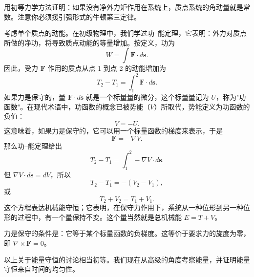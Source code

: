 \begin{example}[用初等力学证明角动量守恒]
用初等力学方法证明：如果没有净外力矩作用在系统上，质点系统的角动量就是常数。注意你必须援引强形式的牛顿第三定律。
\end{example}

考虑单个质点的动能。在初级物理中，我们学过功--能定理，它表明：外力对质点所做的净功，将导致质点动能的等量增加。按定义，功为
\begin{equation}\label{eq:1.W}
W = \int \mathbf{F}\cdot d\mathbf{s}.
\end{equation}
因此，受力 $\mathbf{F}$ 作用的质点从点 1 到点 2 的动能增加为
\begin{equation}\label{eq:1.W12}
T_2 - T_1 = \int_1^2 \mathbf{F}\cdot d\mathbf{s}.
\end{equation}
如果力是保守的，量 $\mathbf{F}\cdot d\mathbf{s}$ 就是一个标量量的微分，这个标量量记为 $U$，称为"功函数"。在现代术语中，功函数的概念已被势能（$V$）所取代，势能定义为功函数的负值：
\begin{equation}\label{eq:1.VU}
V = -U.
\end{equation}
这意味着，如果力是保守的，它可以用一个标量函数的梯度来表示，于是
\begin{equation}\label{eq:1.Fgrad}
\mathbf{F} = -\nabla V.
\end{equation}
那么功--能定理给出
\begin{equation*}
T_2 - T_1 = \int_1^2 -\nabla V\cdot d\mathbf{s}.
\end{equation*}
但 $\nabla V\cdot d\mathbf{s} = dV$，所以
\begin{equation*}
T_2 - T_1 = -(V_2 - V_1),
\end{equation*}
或
\begin{equation}\label{eq:1.Econs}
T_2 + V_2 = T_1 + V_1.
\end{equation}
这个方程表达机械能守恒；它表明，在保守力作用下，系统从一种位形到另一种位形的过程中，有一个量保持不变。这个量当然就是总机械能 $E = T + V$。

力是保守的条件是：它等于某个标量函数的负梯度。这等价于要求力的旋度为零，即 $\nabla\times\mathbf{F} = 0$。

以上关于能量守恒的讨论相当初等。我们现在从高级的角度考察能量，并证明能量守恒来自时间的均匀性。

